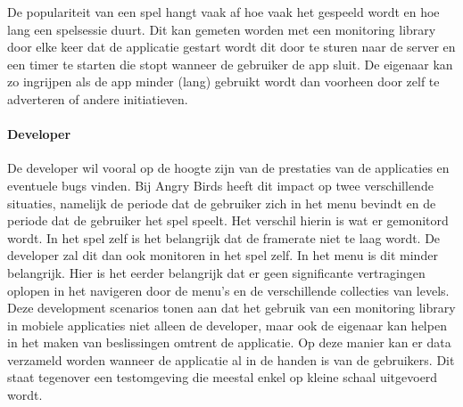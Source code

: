 De populariteit van een spel hangt vaak af hoe vaak het gespeeld wordt en hoe lang een spelsessie duurt. Dit kan gemeten worden met een monitoring library door elke keer dat de applicatie gestart wordt dit door te sturen naar de server en een timer te starten die stopt wanneer de gebruiker de app sluit. De eigenaar kan zo ingrijpen als de app minder (lang) gebruikt wordt dan voorheen door zelf te adverteren of andere initiatieven. \\

\paragraph{Developer}
De developer wil vooral op de hoogte zijn van de prestaties van de applicaties en eventuele bugs vinden. Bij Angry Birds heeft dit impact op twee verschillende situaties, namelijk de periode dat de gebruiker zich in het menu bevindt en de periode dat de gebruiker het spel speelt. Het verschil hierin is wat er gemonitord wordt. In het spel zelf is het belangrijk dat de framerate niet te laag wordt. De developer zal dit dan ook monitoren in het spel zelf. In het menu is dit minder belangrijk. Hier is het eerder belangrijk dat er geen significante vertragingen oplopen in het navigeren door de menu's en de verschillende collecties van levels.\\


Deze development scenarios tonen aan dat het gebruik van een monitoring library in mobiele applicaties niet alleen de developer, maar ook de eigenaar kan helpen in het maken van beslissingen omtrent de applicatie. Op deze manier kan er data verzameld worden wanneer de applicatie al in de handen is van de gebruikers. Dit staat tegenover een testomgeving die meestal enkel op kleine schaal uitgevoerd wordt.






